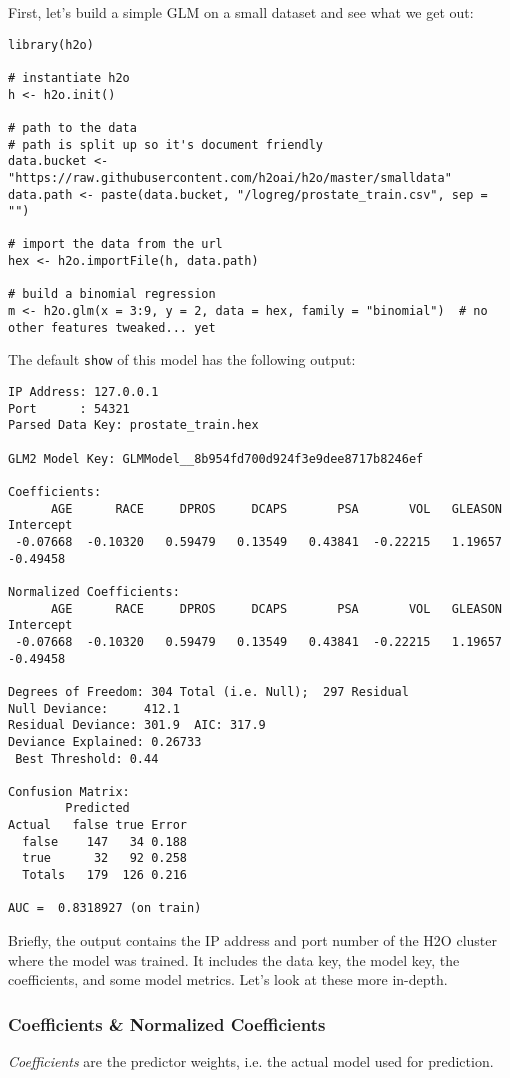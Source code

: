 \documentclass[11pt]{article}
\begin{document}
First, let's build a simple GLM on a small dataset and see what we get out:

\begin{verbatim}
library(h2o)

# instantiate h2o
h <- h2o.init()

# path to the data
# path is split up so it's document friendly
data.bucket <- "https://raw.githubusercontent.com/h2oai/h2o/master/smalldata"
data.path <- paste(data.bucket, "/logreg/prostate_train.csv", sep = "")

# import the data from the url
hex <- h2o.importFile(h, data.path)

# build a binomial regression
m <- h2o.glm(x = 3:9, y = 2, data = hex, family = "binomial")  # no other features tweaked... yet
\end{verbatim}

The default \texttt{show} of this model has the following output:

\begin{verbatim}
IP Address: 127.0.0.1 
Port      : 54321 
Parsed Data Key: prostate_train.hex 

GLM2 Model Key: GLMModel__8b954fd700d924f3e9dee8717b8246ef

Coefficients:
      AGE      RACE     DPROS     DCAPS       PSA       VOL   GLEASON Intercept 
 -0.07668  -0.10320   0.59479   0.13549   0.43841  -0.22215   1.19657  -0.49458 

Normalized Coefficients:
      AGE      RACE     DPROS     DCAPS       PSA       VOL   GLEASON Intercept 
 -0.07668  -0.10320   0.59479   0.13549   0.43841  -0.22215   1.19657  -0.49458 

Degrees of Freedom: 304 Total (i.e. Null);  297 Residual
Null Deviance:     412.1
Residual Deviance: 301.9  AIC: 317.9
Deviance Explained: 0.26733 
 Best Threshold: 0.44

Confusion Matrix:
        Predicted
Actual   false true Error
  false    147   34 0.188
  true      32   92 0.258
  Totals   179  126 0.216

AUC =  0.8318927 (on train) 
\end{verbatim}

Briefly, the output contains the IP address and port number of the H2O cluster where the model was trained. It includes the data key, the model key, the coefficients, and  some model metrics. Let's look at these more in-depth.

\subsubsection{Coefficients \& Normalized Coefficients}
\textit{Coefficients} are the predictor weights, i.e. the actual model used for prediction. 
\end{document}
